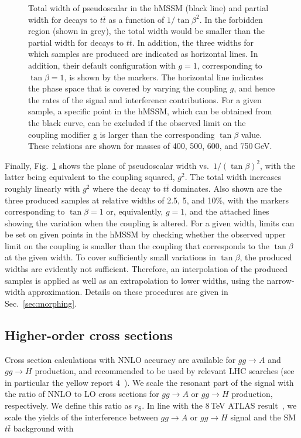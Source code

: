 \begin{figure}[!Hhtb]
\caption{Total width of pseudoscalar in the hMSSM (black line) and partial width for decays to $t\bar t$ as a function of $1/\tan\beta^2$. In the forbidden region (shown in grey), the total width would be smaller than the partial width for decays to $t\bar t$. In addition, the three widths for which samples are produced are indicated as horizontal lines. In addition, their default configuration with $g=1$, corresponding to $\tan\beta = 1$, is shown by the markers. The horizontal line indicates the phase space that is covered by varying the coupling $g$, and hence the rates of the signal and interference contributions. For a given sample, a specific point in the hMSSM, which can be obtained from the black curve, can be excluded if the observed limit on the coupling modifier g is larger than the corresponding $\tan\beta$ value. These relations are shown for masses of 400, 500, 600, and 750\,GeV.}
\label{fig:width_vs_tanb}
\end{figure}

Finally, Fig.~\ref{fig:width_vs_tanb} shows the plane of pseudoscalar width vs.\ $1/(\tan\beta)^2$, with the latter being equivalent to the coupling squared, $g^2$.
The total width increases roughly linearly with $g^2$ where the decay to $t\bar t$ dominates.
Also shown are the three produced samples at relative widths of 2.5, 5, and 10\%, with the markers corresponding to $\tan\beta = 1$ or, equivalently, $g = 1$, and the attached lines showing the variation when the coupling is altered.
For a given width, limits can be set on given points in the hMSSM by checking whether the observed upper limit on the coupling is smaller than the coupling that corresponds to the $\tan\beta$ at the given width.
To cover sufficiently small variations in $\tan\beta$, the produced widths are evidently not sufficient.
Therefore, an interpolation of the produced samples is applied as well as an extrapolation to lower widths, using the narrow-width approximation.
Details on these procedures are given in Sec.~\ref{sec:morphing}.

\subsection{Higher-order cross sections}

Cross section calculations with NNLO accuracy are available for $gg\rightarrow A$ and $gg\rightarrow H$ production, and recommended to be used by relevant LHC searches (see in particular the yellow report 4~\cite{deFlorian:2016spz}).
We scale the resonant part of the signal with the ratio of NNLO to LO cross sections for $gg\rightarrow A$ or $gg\rightarrow H$ production, respectively.
We define this ratio as $r_\text{S}$.
In line with the 8\,TeV ATLAS result~\cite{Hespel:2016qaf,PhysRevLett.119.191803}, we scale the yields of the interference between $gg\rightarrow A$ or $gg\rightarrow H$ signal and the SM $t\bar t$ background with

